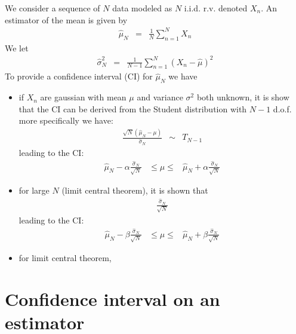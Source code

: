 We consider a sequence of $N$ data modeled as $N$ i.i.d. r.v. denoted $X_{n}$. An estimator of the mean is given by
\begin{eqnarray*}
\hat \mu_{N} &=&\frac{1}{N}\sum_{n=1}^{N}X_{n}
\end{eqnarray*}
We let
\begin{eqnarray*}
\hat\sigma_{N}^{2} &=& \frac{1}{N-1}\sum_{n=1}^{N}(X_{n}-\hat \mu)^{2}
\end{eqnarray*}
To provide a confidence interval (CI) for $\hat\mu_{N}$ we have
\begin{itemize}
\item
if $X_{n}$ are gaussian with mean $\mu$ and variance $\sigma^{2}$ both unknown, it is show that the CI can be derived from the Student distribution with $N-1$ d.o.f. more specifically we have:
\begin{eqnarray*}
\frac{\sqrt{N}(\hat \mu_{N} -\mu)}{\hat\sigma_{N}}&\sim&T_{N-1}
\end{eqnarray*}
leading to the CI:
\begin{eqnarray*}
\hat\mu_{N}-\alpha\frac{\hat\sigma_{N}}{\sqrt{N}}
&
 \leq\mu\leq
&
\hat\mu_{N}+\alpha\frac{\hat\sigma_{N}}{\sqrt{N}}
\end{eqnarray*}

\item
for large $N$ (limit central theorem), it is shown that 
\begin{eqnarray*}
\frac{\hat\sigma_{N}}{\sqrt{N}}
\end{eqnarray*}
leading to the CI:
\begin{eqnarray*}
\hat\mu_{N}-\beta\frac{\hat\sigma_{N}}{\sqrt{N}}
&
 \leq\mu\leq
&
\hat\mu_{N}+\beta\frac{\hat\sigma_{N}}{\sqrt{N}}
\end{eqnarray*}

\item
for limit central theorem, 
\end{itemize}




\section{Confidence interval on an estimator}
